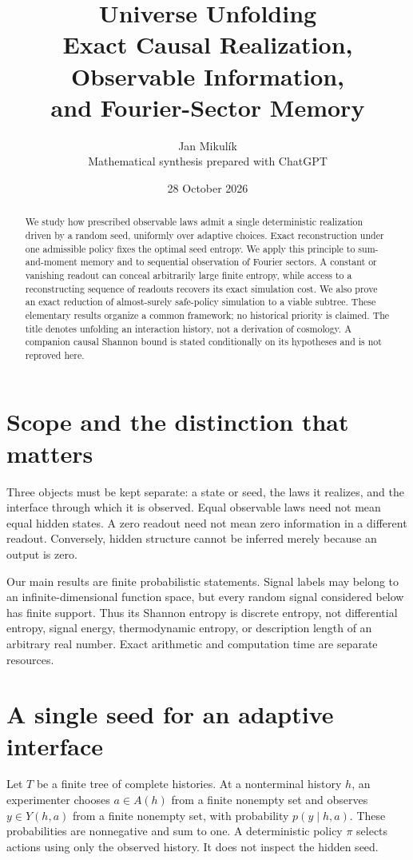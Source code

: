 \documentclass[11pt]{article}
\title{Universe Unfolding\\[4pt]\large Exact Causal Realization, Observable Information,\\and Fourier-Sector Memory}
\author{Jan Mikul\'ik\\\small Mathematical synthesis prepared with ChatGPT}
\date{28 October 2026}
\theoremstyle{remark}\newtheorem{remark}[theorem]{Remark}
\begin{document}
\maketitle
\begin{abstract}
We study how prescribed observable laws admit a single deterministic realization
driven by a random seed, uniformly over adaptive choices. Exact reconstruction
under one admissible policy fixes the optimal seed entropy. We apply this
principle to sum-and-moment memory and to sequential observation of Fourier
sectors. A constant or vanishing readout can conceal arbitrarily large finite
entropy, while access to a reconstructing sequence of readouts recovers its exact
simulation cost. We also prove an exact reduction of almost-surely safe-policy
simulation to a viable subtree. These elementary results organize a common
framework; no historical priority is claimed. The title denotes unfolding an
interaction history, not a derivation of cosmology. A companion causal Shannon
bound is stated conditionally on its hypotheses and is not reproved here.
\end{abstract}

\section{Scope and the distinction that matters}
Three objects must be kept separate: a state or seed, the laws it realizes, and
the interface through which it is observed. Equal observable laws need not mean
equal hidden states. A zero readout need not mean zero information in a different
readout. Conversely, hidden structure cannot be inferred merely because an
output is zero.

Our main results are finite probabilistic statements. Signal labels may belong
to an infinite-dimensional function space, but every random signal considered
below has finite support. Thus its Shannon entropy is discrete entropy, not
differential entropy, signal energy, thermodynamic entropy, or description length
of an arbitrary real number. Exact arithmetic and computation time are separate
resources.

\section{A single seed for an adaptive interface}
Let $T$ be a finite tree of complete histories. At a nonterminal history $h$,
an experimenter chooses $a\in A(h)$ from a finite nonempty set and observes
$y\in Y(h,a)$ from a finite nonempty set, with probability $p(y\mid h,a)$.
These probabilities are nonnegative and sum to one. A deterministic policy
$\pi$ selects actions using only the observed history. It does not inspect the
hidden seed.
\end{document}
